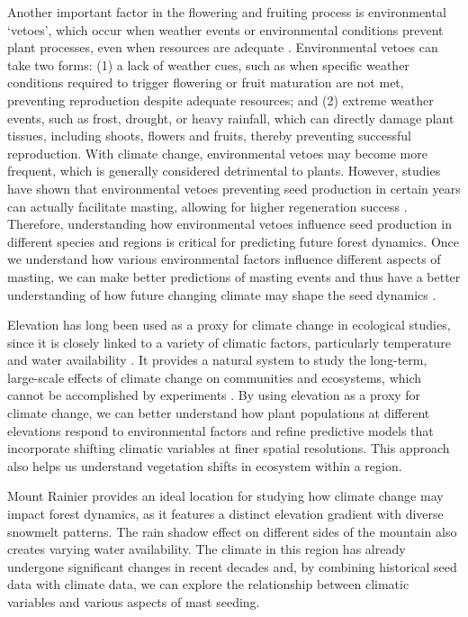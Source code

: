 \documentclass[11pt,letter]{article}
\begin{document}
Another important factor in the flowering and fruiting process is environmental `vetoes', which occur when weather events or environmental conditions prevent plant processes, even when resources are adequate \citep{bogdziewicz2022will}. Environmental vetoes can take two forms: (1) a lack of weather cues, such as when specific weather conditions required to trigger flowering or fruit maturation are not met, preventing reproduction despite adequate resources; and (2) extreme weather events, such as frost, drought, or heavy rainfall, which can directly damage plant tissues, including shoots, flowers and fruits, thereby preventing successful reproduction. With climate change, environmental vetoes may become more frequent, which is generally considered detrimental to plants. However, studies have shown that environmental vetoes preventing seed production in certain years can actually facilitate masting, allowing for higher regeneration success \citep{bogdziewicz2018correlated, bogdziewicz2019environmental}. Therefore, understanding how environmental vetoes influence seed production in different species and regions is critical for predicting future forest dynamics.  Once we understand how various environmental factors influence different aspects of masting, we can make better predictions of masting events and thus have a better understanding of how future changing climate may shape the seed dynamics \citep{hacket2021climate}.\par

Elevation has long been used as a proxy for climate change in ecological studies, since it is closely linked to a variety of climatic factors, particularly temperature and water availability \citep{korner2007use}. It provides a natural system to study the long-term, large-scale effects of climate change on communities and ecosystems, which cannot be accomplished by experiments \citep{sundqvist2013community}. By using elevation as a proxy for climate change, we can better understand how plant populations at different elevations respond to environmental factors and refine predictive models that incorporate shifting climatic variables at finer spatial resolutions. This approach also helps us understand vegetation shifts in ecosystem within a region.\par

Mount Rainier provides an ideal location for studying how climate change may impact forest dynamics, as it features a distinct elevation gradient with diverse snowmelt patterns. The rain shadow effect on different sides of the mountain also creates varying water availability. The climate in this region has already undergone significant changes in recent decades and, by combining historical seed data with climate data, we can explore the relationship between climatic variables and various aspects of mast seeding.\par
\end{document}
